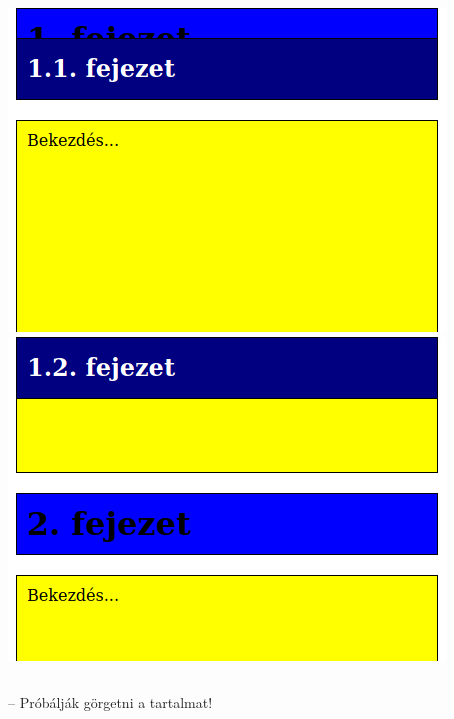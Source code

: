 \begin{frame}
\begin{columns}[T]
      \includegraphics[width=\textwidth]{sticky2.png}
      \includegraphics[width=\textwidth]{sticky3.png}
  \end{columns}
  \begin{center}
     -- Próbálják görgetni a tartalmat!
  \end{center}
\end{frame}

\begin{frame}
  \begin{columns}[c]
      \begin{exampleblock}{}
        \fontsize{7}{8} \selectfont
        
      \end{exampleblock}
      \begin{exampleblock}{}
        \fontsize{7}{8} \selectfont
        
        
      \end{exampleblock}
  \end{columns}
\end{frame}

